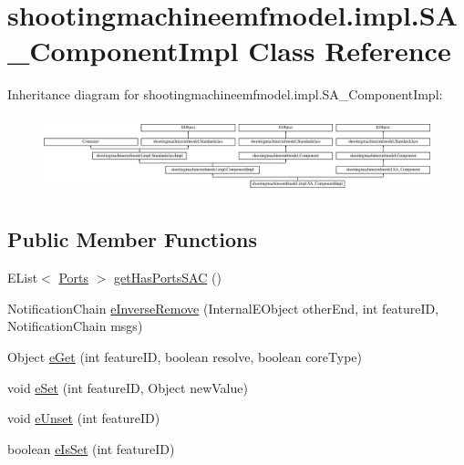 \hypertarget{classshootingmachineemfmodel_1_1impl_1_1_s_a___component_impl}{\section{shootingmachineemfmodel.\-impl.\-S\-A\-\_\-\-Component\-Impl Class Reference}
\label{classshootingmachineemfmodel_1_1impl_1_1_s_a___component_impl}
}
Inheritance diagram for shootingmachineemfmodel.\-impl.\-S\-A\-\_\-\-Component\-Impl\-:\begin{figure}[H]
\begin{center}
\leavevmode
\includegraphics[height=2.287582cm]{classshootingmachineemfmodel_1_1impl_1_1_s_a___component_impl}
\end{center}
\end{figure}
\subsection*{Public Member Functions}
\begin{DoxyCompactItemize}
\item 
E\-List$<$ \hyperlink{interfaceshootingmachineemfmodel_1_1_ports}{Ports} $>$ \hyperlink{classshootingmachineemfmodel_1_1impl_1_1_s_a___component_impl_a33cf8cec28514b7843445dc395c5b072}{get\-Has\-Ports\-S\-A\-C} ()
\item 
Notification\-Chain \hyperlink{classshootingmachineemfmodel_1_1impl_1_1_s_a___component_impl_a20ba3fa4c8c88246ee9e45c29e970722}{e\-Inverse\-Remove} (Internal\-E\-Object other\-End, int feature\-I\-D, Notification\-Chain msgs)
\item 
Object \hyperlink{classshootingmachineemfmodel_1_1impl_1_1_s_a___component_impl_afffc9552bf498c0e7a4afd8adc533a91}{e\-Get} (int feature\-I\-D, boolean resolve, boolean core\-Type)
\item 
void \hyperlink{classshootingmachineemfmodel_1_1impl_1_1_s_a___component_impl_a751c85f5c86826ae00cbc5a9557c49be}{e\-Set} (int feature\-I\-D, Object new\-Value)
\item 
void \hyperlink{classshootingmachineemfmodel_1_1impl_1_1_s_a___component_impl_ab680a945ec5b2eb5fe104b9275104ae9}{e\-Unset} (int feature\-I\-D)
\item 
boolean \hyperlink{classshootingmachineemfmodel_1_1impl_1_1_s_a___component_impl_a5fc50cb1c235f29707ab774fe8e0b3a1}{e\-Is\-Set} (int feature\-I\-D)
\end{DoxyCompactItemize}
